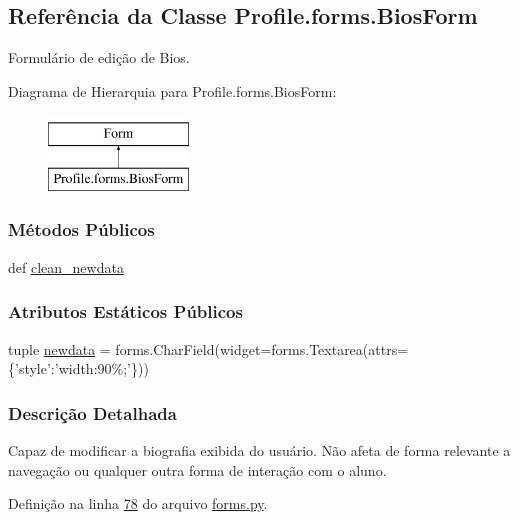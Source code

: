 \hypertarget{classProfile_1_1forms_1_1BiosForm}{\subsection{Referência da Classe Profile.\-forms.\-Bios\-Form}
\label{classProfile_1_1forms_1_1BiosForm}
}


Formulário de edição de Bios.  


Diagrama de Hierarquia para Profile.\-forms.\-Bios\-Form\-:\begin{figure}[H]
\begin{center}
\leavevmode
\includegraphics[height=2.000000cm]{d7/d1e/classProfile_1_1forms_1_1BiosForm}
\end{center}
\end{figure}
\subsubsection*{Métodos Públicos}
\begin{DoxyCompactItemize}
\item 
def \hyperlink{classProfile_1_1forms_1_1BiosForm_a10f21ed8d7cb888f0aa35618087c86af}{clean\-\_\-newdata}
\end{DoxyCompactItemize}
\subsubsection*{Atributos Estáticos Públicos}
\begin{DoxyCompactItemize}
\item 
tuple \hyperlink{classProfile_1_1forms_1_1BiosForm_a2862b20c24bac9aa5dc896925a2cb3d6}{newdata} = forms.\-Char\-Field(widget=forms.\-Textarea(attrs=\{'style'\-:'width\-:90\%;'\}))
\end{DoxyCompactItemize}


\subsubsection{Descrição Detalhada}
Capaz de modificar a biografia exibida do usuário. Não afeta de forma relevante a navegação ou qualquer outra forma de interação com o aluno. 

Definição na linha \hyperlink{Profile_2forms_8py_source_l00078}{78} do arquivo \hyperlink{Profile_2forms_8py_source}{forms.\-py}.



